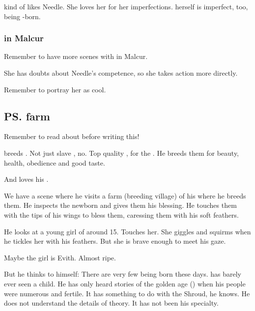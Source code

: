 \begin{garbage}
\Achsah{} kind of likes Needle. 
She loves her for her imperfections. 
\Achsah{} herself is imperfect, too, being \bezed-born. 




\subsubsection{\Achsah{} in Malcur}
Remember to have more scenes with \Achsah{} in Malcur. 

She has doubts about Needle's competence, so she takes action more directly. 

Remember to portray her as cool. 








\subsection{\ps{\Teshrial} farm}
Remember to read about \hs{\Teshrial} before writing this! 

\Teshrial{} breeds \humans. 
Not just slave \humans, no. 
Top quality \humans{}, for the . 
He breeds them for beauty, health, obedience and good taste. 


And \Teshrial{} loves his \humans. 

We have a scene where he visits a farm (breeding village) of his where he breeds them. 
He inspects the newborn and gives them his blessing. 
He touches them with the tips of his wings to bless them, caressing them with his soft feathers. 

He looks at a young girl of around 15. 
Touches her. 
She giggles and squirms when he tickles her with his feathers. 
But she is brave enough to meet his gaze. 


Maybe the girl is Evith. 
Almost ripe. 


But he thinks to himself: 
There are very few \resphain{} being born these days. 
\Teshrial{} has barely ever seen a \resphan{} child. 
He has only heard stories of the golden age () when his people were numerous and fertile. 
It has something to do with the Shroud, he knows. 
He does not understand the details of \dweomer{} theory. 
It has not been his specialty. 


\end{garbage}
